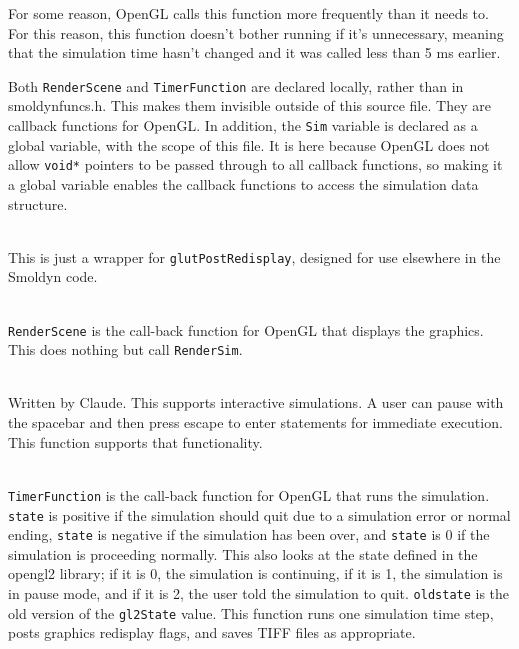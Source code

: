 \documentclass {scrbook}
\newcommand {\ttt} {\texttt}
\begin{document}
\begin{description}
For some reason, OpenGL calls this function more frequently than it needs to. For this reason, this function doesn't bother running if it's unnecessary, meaning that the simulation time hasn't changed and it was called less than 5 ms earlier.

\item[\underline{Top level OpenGL functions}]

Both \ttt{RenderScene} and \ttt{TimerFunction} are declared locally, rather than in smoldynfuncs.h. This makes them invisible outside of this source file. They are callback functions for OpenGL. In addition, the \ttt{Sim} variable is declared as a global variable, with the scope of this file. It is here because OpenGL does not allow \ttt{void*} pointers to be passed through to all callback functions, so making it a global variable enables the callback functions to access the simulation data structure.

\item[\ttt{smolPostRedisplay(void)}]
\hfill \\
This is just a wrapper for \ttt{glutPostRedisplay}, designed for use elsewhere in the Smoldyn code.

\item[\ttt{void RenderScene(void)}]
\hfill \\
\ttt{RenderScene} is the call-back function for OpenGL that displays the graphics. This does nothing but call \ttt{RenderSim}.

\item[\ttt{void graphicsreadstatements(simptr sim)}]
\hfill \\
Written by Claude. This supports interactive simulations. A user can pause with the spacebar and then press escape to enter statements for immediate execution. This function supports that functionality.

\item[\ttt{void TimerFunction(int state)}]
\hfill \\
\ttt{TimerFunction} is the call-back function for OpenGL that runs the simulation. \ttt{state} is positive if the simulation should quit due to a simulation error or normal ending, \ttt{state} is negative if the simulation has been over, and \ttt{state} is 0 if the simulation is proceeding normally. This also looks at the state defined in the opengl2 library; if it is 0, the simulation is continuing, if it is 1, the simulation is in pause mode, and if it is 2, the user told the simulation to quit. \ttt{oldstate} is the old version of the \ttt{gl2State} value. This function runs one simulation time step, posts graphics redisplay flags, and saves TIFF files as appropriate.


\end{description}
\end{document}
